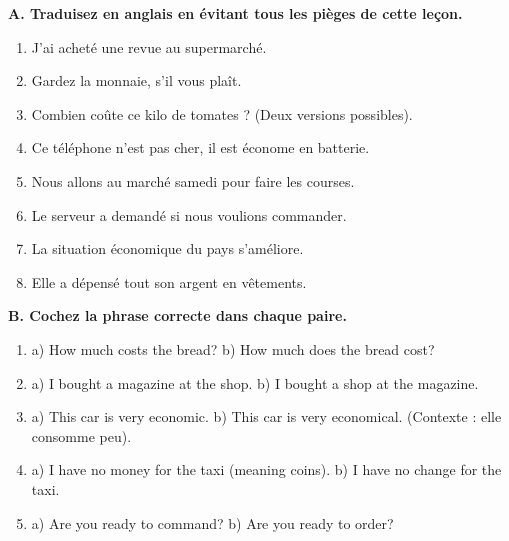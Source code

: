 \documentclass[11pt]{article}
\begin{document}
\begin{exercice}
\textbf{A. Traduisez en anglais en évitant tous les pièges de cette leçon.}
\begin{enumerate}
    \item J'ai acheté une revue au supermarché.
    \item Gardez la monnaie, s'il vous plaît.
    \item Combien coûte ce kilo de tomates ? (Deux versions possibles).
    \item Ce téléphone n'est pas cher, il est économe en batterie.
    \item Nous allons au marché samedi pour faire les courses.
    \item Le serveur a demandé si nous voulions commander.
    \item La situation économique du pays s'améliore.
    \item Elle a dépensé tout son argent en vêtements.
\end{enumerate}

\textbf{B. Cochez la phrase correcte dans chaque paire.}
\begin{enumerate}
    \item a) How much costs the bread? \quad b) How much does the bread cost?
    \item a) I bought a magazine at the shop. \quad b) I bought a shop at the magazine.
    \item a) This car is very economic. \quad b) This car is very economical. (Contexte : elle consomme peu).
    \item a) I have no money for the taxi (meaning coins). \quad b) I have no change for the taxi.
    \item a) Are you ready to command? \quad b) Are you ready to order?
\end{enumerate}
\end{exercice}
\end{document}
